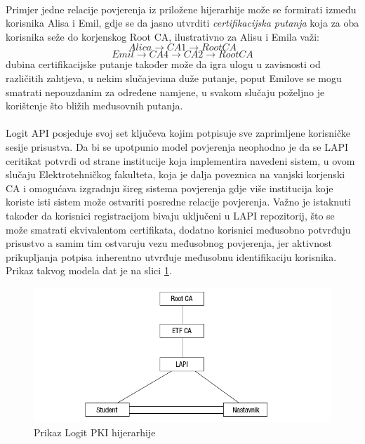 \paragraph*{}
Primjer jedne relacije povjerenja iz priložene hijerarhije može se formirati između korisnika Alisa i Emil, gdje se da jasno utvrditi \textit{certifikacijska putanja} koja za oba korisnika seže do korjenskog Root CA, ilustrativno za Alisu i Emila važi: \[Alica \to CA1 \to Root CA\] \[Emil \to CA4 \to CA2 \to Root CA\] dubina certifikacijske putanje također može da igra ulogu u zavisnosti od različitih zahtjeva, u nekim slučajevima duže putanje, poput Emilove se mogu smatrati nepouzdanim za određene namjene, u svakom slučaju poželjno je korištenje što bližih međusovnih putanja.

\paragraph*{}
Logit API posjeduje svoj set ključeva kojim potpisuje sve zaprimljene korisničke sesije prisustva. Da bi se upotpunio model povjerenja neophodno je da se LAPI ceritikat potvrdi od strane institucije koja implementira navedeni sistem, u ovom slučaju Elektrotehničkog fakulteta, koja je dalja poveznica na vanjski korjenski CA i omogućava izgradnju šireg sistema povjerenja gdje više institucija koje koriste isti sistem može ostvariti posredne relacije povjerenja. Važno je istaknuti također da korisnici registracijom bivaju uključeni u LAPI repozitorij, što se može smatrati ekvivalentom certifikata, dodatno korisnici međusobno potvrđuju prisustvo a samim tim ostvaruju vezu međusobnog povjerenja, jer aktivnost prikupljanja potpisa inherentno utvrđuje međusobnu identifikaciju korisnika. Prikaz takvog modela dat je na slici \ref{fig:logit_pki}.

\begin{figure}[H]
    \centering
    \includegraphics[width=1.0\textwidth]{material/logit_pki}
    \caption{Prikaz Logit PKI hijerarhije}
    \label{fig:logit_pki}
\end{figure}

